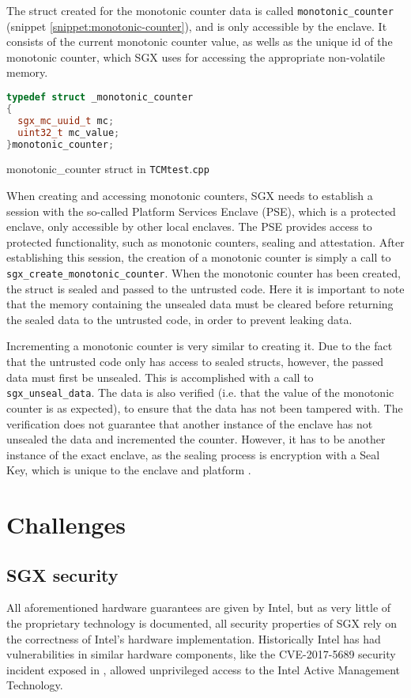 \documentclass[12pt]{article}
\begin{document}
	The struct created for the monotonic counter data is called \texttt{monotonic\_counter} (snippet \ref{snippet:monotonic-counter}), and is only accessible by the enclave. It consists of the current monotonic counter value, as wells as the unique id of the monotonic counter, which SGX uses for accessing the appropriate non-volatile memory.
	\begin{snippet}[!ht]
		\begin{lstlisting}[language=C++, numbers=none]
typedef struct _monotonic_counter
{
  sgx_mc_uuid_t mc;
  uint32_t mc_value;
}monotonic_counter;
		\end{lstlisting}
		\caption{monotonic\_counter struct in \texttt{TCMtest$.$cpp} \label{snippet:monotonic-counter}}
	\end{snippet}

	When creating and accessing monotonic counters, SGX needs to establish a session with the so-called Platform Services Enclave (PSE), which is a protected enclave, only accessible by other local enclaves. 
	The PSE provides access to protected functionality, such as monotonic counters, sealing and attestation.
	After establishing this session, the creation of a monotonic counter is simply a call to \texttt{sgx\_create\_monotonic\_counter}.
	When the monotonic counter has been created, the struct is sealed and passed to the untrusted code. 
	Here it is important to note that the memory containing the unsealed data must be cleared before returning the sealed data to the untrusted code, in order to prevent leaking data.

	Incrementing a monotonic counter is very similar to creating it. 
	Due to the fact that the untrusted code only has access to sealed structs, however, the passed data must first be unsealed. 
	This is accomplished with a call to \texttt{sgx\_unseal\_data}. 
	The data is also verified (i.e. that the value of the monotonic counter is as expected), to ensure that the data has not been tampered with.
	The verification does not guarantee that another instance of the enclave has not unsealed the data and incremented the counter. 
	However, it has to be another instance of the exact enclave, as the sealing process is encryption with a Seal Key, which is unique to the enclave and platform \cite{sgx-dev-guide}.

	\section{Challenges}

		\subsection{SGX security}
    All aforementioned hardware guarantees are given by Intel, but as very little of the proprietary technology is documented, all security properties of SGX rely on the correctness of Intel's hardware implementation.
    Historically Intel has had vulnerabilities in similar hardware components, like the CVE-2017-5689 security incident exposed in \cite{silent-bob}, allowed unprivileged access to the Intel Active Management Technology.
\end{document}
